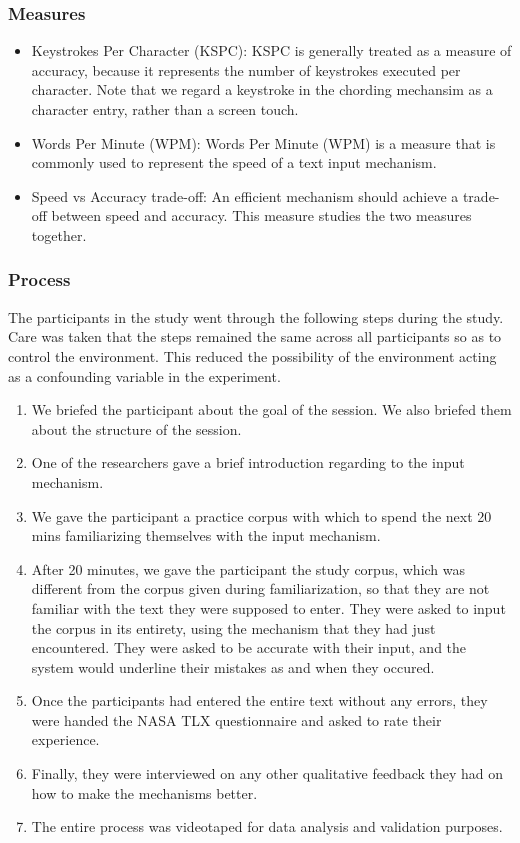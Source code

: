 \subsubsection{Measures}
\begin{itemize}
\item Keystrokes Per Character (KSPC): KSPC is generally treated as a
  measure of accuracy, because it represents the number of keystrokes
  executed per character.  Note that we regard a keystroke in the
  chording mechansim as a character entry, rather than a screen touch.
\item Words Per Minute (WPM): Words Per Minute (WPM) is a measure that
  is commonly used to represent the speed of a text input mechanism.
\item Speed vs Accuracy trade-off: An efficient mechanism should
  achieve a trade-off between speed and accuracy. This measure studies
  the two measures together.
\end{itemize}

\subsubsection{Process}

The participants in the study went through the following steps during
the study. Care was taken that the steps remained the same across all
participants so as to control the environment. This reduced the
possibility of the environment acting as a confounding variable in the
experiment. 

\begin{enumerate}
\item We briefed the participant about the goal of the session. We also
  briefed them about the structure of the session.
\item One of the researchers gave a brief introduction regarding to
  the input mechanism. 
\item We gave the participant a practice corpus with which to spend
  the next 20 mins familiarizing themselves with the input mechanism.
\item After 20 minutes, we gave the participant the study corpus, which
  was different from the corpus given during familiarization, so that
  they are not familiar with the text they were supposed to
  enter. They were asked to input the corpus in its entirety, using
  the mechanism that they had just encountered. They were asked to be
  accurate with their input, and the system would underline their
  mistakes as and when they occured.
\item Once the participants had entered the entire text without any
  errors, they were handed the NASA TLX questionnaire and asked to
  rate their experience.
\item Finally, they were interviewed on any other qualitative feedback
  they had on how to make the mechanisms better.
\item The entire process was videotaped for data analysis and
  validation purposes.
\end{enumerate}
	